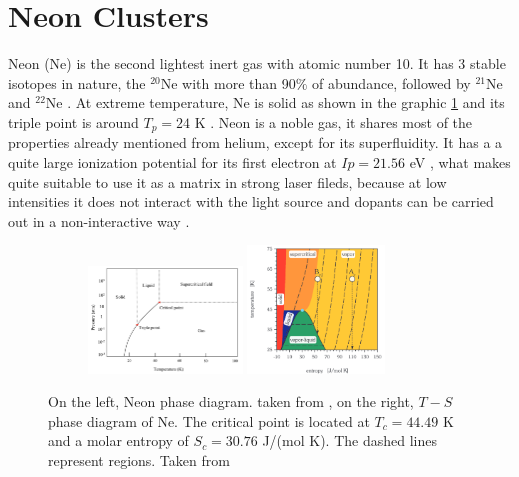 \section{Neon Clusters}

Neon (Ne) is the second lightest inert gas with atomic number 10. It has 3 stable isotopes in nature, the $^{20}$Ne with more than 90$\%$ of abundance, followed by $^{21}$Ne and  $^{22}$Ne \cite{meija_atomic_2016}. At extreme temperature, Ne is solid as shown in the graphic \ref{fig:Nephases} and its triple point is around $T_{p}=24$ K \cite{young_phase_nodate}. Neon is a noble gas, it shares most of the properties already mentioned from helium, except for its superfluidity.  It has a a quite large ionization potential for its first electron at $Ip=21.56$ eV \cite{iablonskyi_slow_2016}, what makes quite suitable to use it as a matrix in strong laser fileds, because at low intensities it does not interact with the light source and dopants can be carried out in a non-interactive way \cite{campargue_atomic_2012}.
  

\begin{figure}[h!]
\centering
\begin{subfigure}[l]{1\textwidth}
\includegraphics[width=0.45\textwidth]{../Images/Ne_temp_phases.png} \hfill
\includegraphics[width=0.4\textwidth]{../Images/T-s ne phase diagran.png}
\end{subfigure}
\caption[Neon phase-Isentropic diagrams]{On the left, Neon phase diagram. taken from \cite{young_phase_nodate}, on the right, $T-S$ phase diagram of Ne. The critical point is located at $T_{c}= 44.49$ K and a molar entropy of $S_{c}=30.76$ J/(mol K). The dashed lines represent regions. Taken from \cite{christen_supersonic_2010-1} }
\label{fig:Nephases}
\end{figure}

